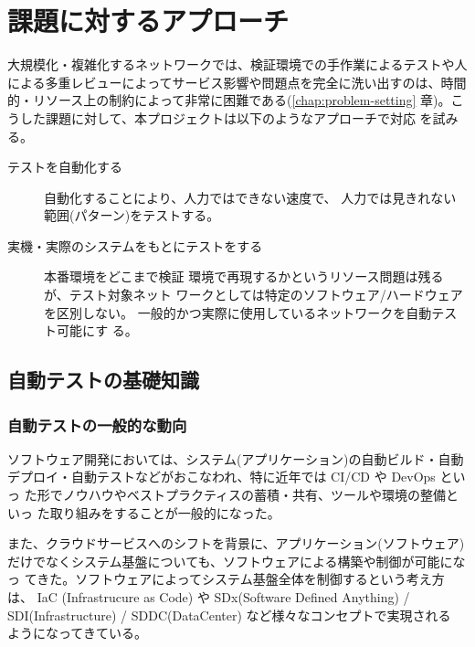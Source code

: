 
\chapter{課題に対するアプローチ}
\label{chap:approach}


大規模化・複雑化するネットワークでは、検証環境での手作業によるテストや人
による多重レビューによってサービス影響や問題点を完全に洗い出すのは、時間
的・リソース上の制約によって非常に困難である(\ref{chap:problem-setting}
章)。こうした課題に対して、本プロジェクトは以下のようなアプローチで対応
を試みる。
\begin{description}
 \item[テストを自動化する] 自動化することにより、人力ではできない速度で、
            人力では見きれない範囲(パターン)をテストする。
 \item[実機・実際のシステムをもとにテストをする] 本番環境をどこまで検証
            環境で再現するかというリソース問題は残るが、テスト対象ネット
            ワークとしては特定のソフトウェア/ハードウェアを区別しない。
            一般的かつ実際に使用しているネットワークを自動テスト可能にす
            る。
\end{description}


\section{自動テストの基礎知識}
\label{sec:latedge-test-automation}


  \subsection{自動テストの一般的な動向}
  \label{sec:popular-test-automation}

ソフトウェア開発においては、システム(アプリケーション)の自動ビルド・自動
デプロイ・自動テストなどがおこなわれ、特に近年では CI/CD や DevOps といっ
た形でノウハウやベストプラクティスの蓄積・共有、ツールや環境の整備といっ
た取り組みをすることが一般的になった。

また、クラウドサービスへのシフトを背景に、アプリケーション(ソフトウェア)
だけでなくシステム基盤についても、ソフトウェアによる構築や制御が可能になっ
てきた。ソフトウェアによってシステム基盤全体を制御するという考え方は、
IaC (Infrastrucure as Code) や SDx(Software Defined Anything) /
SDI(Infrastructure) / SDDC(DataCenter) など様々なコンセプトで実現される
ようになってきている。

